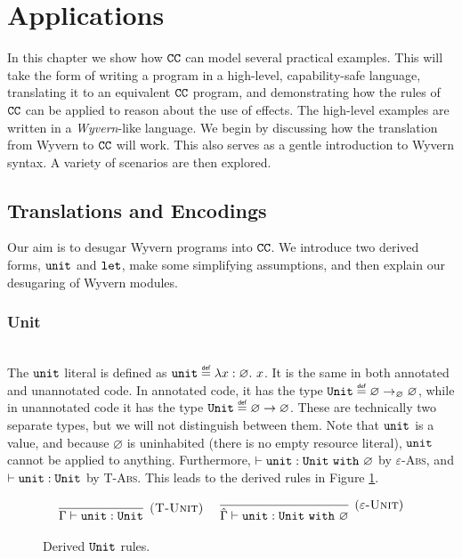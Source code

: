
\section{Applications}

In this chapter we show how $\mathtt{CC}$ can model several practical examples. This will take the form of writing a program in a high-level, capability-safe language, translating it to an equivalent $\mathtt{CC}$ program, and demonstrating how the rules of $\mathtt{CC}$ can be applied to reason about the use of effects. The high-level examples are written in a \textit{Wyvern}-like language. We begin by discussing how the translation from Wyvern to $\mathtt{CC}$ will work. This also serves as a gentle introduction to Wyvern syntax. A variety of scenarios are then explored.


\subsection{Translations and Encodings}

Our aim is to desugar Wyvern programs into $\mathtt{CC}$. We introduce two derived forms, $\mathtt{unit}$ and $\mathtt{let}$, make some simplifying assumptions, and then explain our desugaring of Wyvern modules.\\

\subsubsection{Unit}~\\

The $\mathtt{unit}$ literal is defined as $\unit \defn \lambda x: \varnothing.~x$. It is the same in both annotated and unannotated code. In annotated code, it has the type $\Unit \defn \varnothing \rightarrow_{\varnothing} \varnothing$, while in unannotated code it has the type $\Unit \defn \varnothing \rightarrow \varnothing$. These are technically two separate types, but we will not distinguish between them. Note that $\mathtt{unit}$ is a value, and because $\varnothing$ is uninhabited (there is no empty resource literal), $\mathtt{unit}$ cannot be applied to anything. Furthermore, $\vdash \mathtt{unit}: \mathtt{Unit}~\mathtt{with}~ \varnothing$ by \textsc{$\varepsilon$-Abs}, and $\vdash \mathtt{unit}: \mathtt{Unit}$ by \textsc{T-Abs}. This leads to the derived rules in Figure \ref{fig:unit_rules}.

\begin{figure}[h]




\[
\begin{array}{c}

\infer[\textsc{(T-Unit)}]
	{\Gamma \vdash \unit : \Unit}
	{} ~~~~

\infer[(\textsc{$\varepsilon$-Unit})]
	{\hat \Gamma \vdash \unit : \Unit~\kw{with} \varnothing}
	{}

\end{array}
\]

\caption{Derived $\mathtt{Unit}$ rules.}
\label{fig:unit_rules}
\end{figure}

